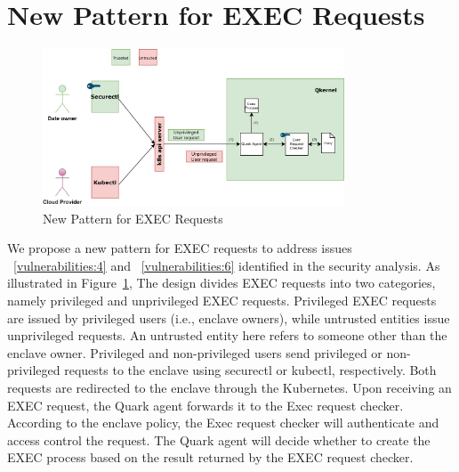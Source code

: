 \section{New Pattern for EXEC Requests}
\label{sec:design_EXEC_Requests}
\begin{figure}[!htb]
    \centering
    \includegraphics[width=0.8\textwidth]{images/new_pattern_of_exec.png}
    \caption[New Pattern for EXEC Requests]{New Pattern for EXEC Requests}
    \label{fig:new_pattern_of_exec}
\end{figure}

We propose a new pattern for EXEC requests to address issues ~\ref{vulnerabilities:4} and ~\ref{vulnerabilities:6} identified in the security analysis. As illustrated in Figure~\ref{fig:new_pattern_of_exec}, The design divides EXEC requests into two categories, namely privileged and unprivileged EXEC requests. 
Privileged EXEC requests are issued by privileged users (i.e., enclave owners), while untrusted entities issue unprivileged requests. An untrusted entity here refers to someone other than the enclave owner. Privileged and non-privileged users send privileged or non-privileged requests to the enclave using securectl or kubectl, respectively. Both requests
are redirected to the enclave through the Kubernetes. Upon receiving an EXEC request, the Quark agent forwards it to the Exec request checker. According to the enclave policy, the Exec request checker will authenticate and access control the request. The Quark agent will decide whether to create the 
EXEC process based on the result returned by the EXEC request checker.


